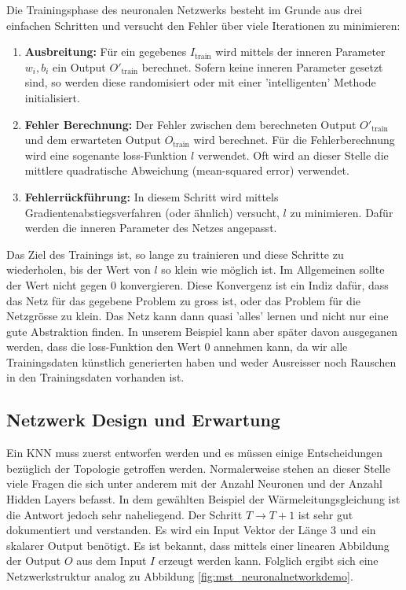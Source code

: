 Die Trainingsphase des neuronalen Netzwerks besteht im Grunde aus drei einfachen Schritten und versucht den Fehler über viele Iterationen zu minimieren:
\begin{enumerate}
	\item {\textbf{Ausbreitung:} Für ein gegebenes $I_{\text{train}}$ wird mittels der inneren Parameter $w_{i}, b_{i}$ ein Output $O'_{\text{train}}$ berechnet. Sofern keine inneren Parameter gesetzt sind, so werden diese randomisiert oder mit einer 'intelligenten' Methode initialisiert.}
	\item {\textbf{Fehler Berechnung:} Der Fehler zwischen dem berechneten Output $O'_{\text{train}}$ und dem erwarteten Output $O_{\text{train}}$ wird berechnet. Für die Fehlerberechnung wird eine sogenante loss-Funktion $l$ verwendet. Oft wird an dieser Stelle die mittlere quadratische Abweichung (mean-squared error) verwendet.}
	\item{\textbf{Fehlerrückführung:} In diesem Schritt wird mittels Gradientenabstiegsverfahren (oder ähnlich) versucht, $l$ zu minimieren. Dafür werden die inneren Parameter des Netzes angepasst.}
\end{enumerate}
Das Ziel des Trainings ist, so lange zu trainieren und diese Schritte zu wiederholen, bis der Wert von $l$ so klein wie möglich ist. 
Im Allgemeinen sollte der Wert nicht gegen 0 konvergieren. Diese Konvergenz ist ein Indiz dafür, dass das Netz für das gegebene Problem zu gross ist, oder das Problem für die Netzgrösse zu klein. Das Netz kann dann quasi 'alles' lernen und nicht nur eine gute Abstraktion finden.
In unserem Beispiel kann aber später davon ausgeganen werden, dass die loss-Funktion den Wert 0 annehmen kann, da wir alle Trainingsdaten künstlich generierten haben und weder Ausreisser noch Rauschen in den Trainingsdaten vorhanden ist.

\subsection{Netzwerk Design und Erwartung}
Ein KNN muss zuerst entworfen werden und es müssen einige Entscheidungen bezüglich der Topologie getroffen werden. Normalerweise stehen an dieser Stelle viele Fragen die sich unter anderem mit der Anzahl Neuronen und der Anzahl Hidden Layers befasst. In dem gewählten Beispiel der Wärmeleitungsgleichung ist die Antwort jedoch sehr naheliegend. Der Schritt $T \rightarrow T+1$ ist sehr gut dokumentiert und verstanden. Es wird ein Input Vektor der Länge 3 und ein skalarer Output benötigt. Es ist bekannt, dass mittels einer linearen Abbildung der Output $O$ aus dem Input $I$ erzeugt werden kann. Folglich ergibt sich eine Netzwerkstruktur analog zu Abbildung \ref{fig:mst_neuronalnetworkdemo}.

